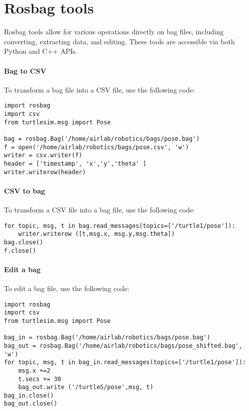 \section{Rosbag tools}

Rosbag tools allow for various operations directly on bag files, including converting, extracting data, and editing. 
These tools are accessible via both Python and C++ APIs.

\paragraph*{Bag to CSV}
To transform a bag file into a CSV file, use the following code:
\begin{verbatim}
import rosbag
import csv
from turtlesim.msg import Pose

bag = rosbag.Bag('/home/airlab/robotics/bags/pose.bag')
f = open('/home/airlab/robotics/bags/pose.csv', 'w')
writer = csv.writer(f)
header = ['timestamp', 'x','y','theta' ]
writer.writerow(header)
\end{verbatim}

\paragraph*{CSV to bag}
To transform a CSV file into a bag file, use the following code:
\begin{verbatim}
for topic, msg, t in bag.read_messages(topics=['/turtle1/pose']):
    writer.writerow ([t,msg.x, msg.y,msg.theta])
bag.close()
f.close()
\end{verbatim}

\paragraph*{Edit a bag}
To edit a bag file, use the following code:
\begin{verbatim}
import rosbag
import csv
from turtlesim.msg import Pose

bag_in = rosbag.Bag('/home/airlab/robotics/bags/pose.bag')
bag_out = rosbag.Bag('/home/airlab/robotics/bags/pose_shifted.bag', 'w')
for topic, msg, t in bag_in.read_messages(topics=['/turtle1/pose']):
    msg.x +=2
    t.secs += 30
    bag_out.write ('/turtleS/pose',msg, t)
bag_in.close()
bag_out.close()
\end{verbatim}